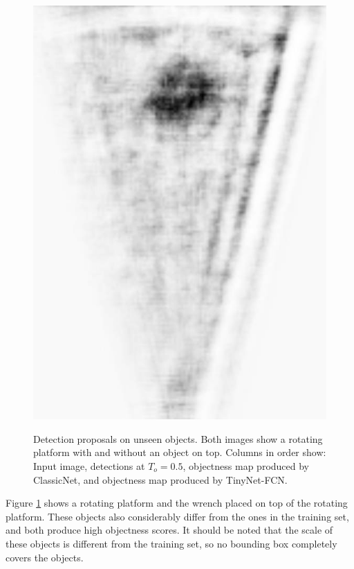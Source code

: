 \begin{figure}[!t]
{        \includegraphics[height=0.2\textheight]{chapters/images/proposals/unseen/rotating-platform-wrench-fcn.jpg}
    }
    \vspace*{0.5cm}
    \forcerectofloat
    \caption[Detection proposals on unseen objects]{Detection proposals on unseen objects. Both images show a rotating platform with and without an object on top. Columns in order show: Input image, detections at $T_o = 0.5$, objectness map produced by ClassicNet, and objectness map produced by TinyNet-FCN.}
    \label{proposals:unseenObjectsTwo}
\end{figure}

Figure \ref{proposals:unseenObjectsTwo} shows a rotating platform and the wrench placed on top of the rotating platform. These objects also considerably differ from the ones in the training set, and both produce high objectness scores. It should be noted that the scale of these objects is different from the training set, so no bounding box completely covers the objects.

